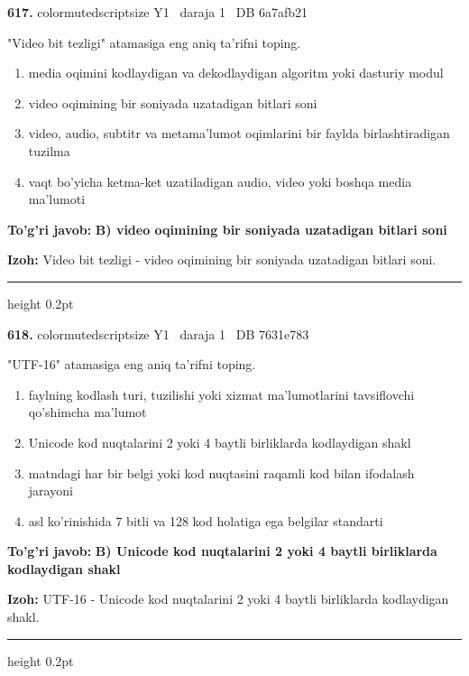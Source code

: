 \documentclass[10pt,a4paper,oneside]{article}
\begin{document}
\noindent\textbf{\color{ink}617.}  {color{muted}scriptsize Y1 \textbullet\ daraja 1 \textbullet\ DB 6a7afb21}
\par
"Video bit tezligi" atamasiga eng aniq ta'rifni toping.
\begin{enumerate}[label=\Alph*),leftmargin=9mm]
\item media oqimini kodlaydigan va dekodlaydigan algoritm yoki dasturiy modul
\item video oqimining bir soniyada uzatadigan bitlari soni
\item video, audio, subtitr va metama'lumot oqimlarini bir faylda birlashtiradigan tuzilma
\item vaqt bo'yicha ketma-ket uzatiladigan audio, video yoki boshqa media ma'lumoti
\end{enumerate}
\begin{tcolorbox}[enhanced,breakable,colback=teal!4,colframe=teal!50!black,boxrule=0.5pt,arc=1.1mm,left=3mm,right=3mm,top=1.7mm,bottom=1.7mm,before skip=2mm,after skip=2mm]
\textbf{\color{teal}To'g'ri javob:} \textbf{B) video oqimining bir soniyada uzatadigan bitlari soni}
\par\smallskip
\textbf{Izoh:} Video bit tezligi - video oqimining bir soniyada uzatadigan bitlari soni.
\end{tcolorbox}
\vspace{2mm}\hrule height 0.2pt \vspace{3mm}

\noindent\textbf{\color{ink}618.}  {color{muted}scriptsize Y1 \textbullet\ daraja 1 \textbullet\ DB 7631e783}
\par
"UTF-16" atamasiga eng aniq ta'rifni toping.
\begin{enumerate}[label=\Alph*),leftmargin=9mm]
\item faylning kodlash turi, tuzilishi yoki xizmat ma'lumotlarini tavsiflovchi qo'shimcha ma'lumot
\item Unicode kod nuqtalarini 2 yoki 4 baytli birliklarda kodlaydigan shakl
\item matndagi har bir belgi yoki kod nuqtasini raqamli kod bilan ifodalash jarayoni
\item asl ko'rinishida 7 bitli va 128 kod holatiga ega belgilar standarti
\end{enumerate}
\begin{tcolorbox}[enhanced,breakable,colback=teal!4,colframe=teal!50!black,boxrule=0.5pt,arc=1.1mm,left=3mm,right=3mm,top=1.7mm,bottom=1.7mm,before skip=2mm,after skip=2mm]
\textbf{\color{teal}To'g'ri javob:} \textbf{B) Unicode kod nuqtalarini 2 yoki 4 baytli birliklarda kodlaydigan shakl}
\par\smallskip
\textbf{Izoh:} UTF-16 - Unicode kod nuqtalarini 2 yoki 4 baytli birliklarda kodlaydigan shakl.
\end{tcolorbox}
\vspace{2mm}\hrule height 0.2pt \vspace{3mm}
\end{document}
